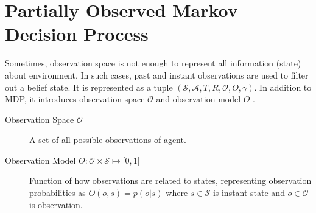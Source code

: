 \section{Partially Observed Markov Decision Process}
\label{sec:pomdp}

Sometimes, observation space is not enough to represent all information (state) about environment. 
In such cases, past and instant observations are used to filter out a belief state. 
It is represented as a tuple $(\mathcal{S},\mathcal{A},T,R,\mathcal{O},O,\gamma)$. 
In addition to MDP, it introduces observation space $\mathcal{O}$ and observation model $O$ \cite{francois-lavet_introduction_2018}. 

\begin{description}
	\item[Observation Space $\mathcal{O}$] A set of all possible observations of agent.
	\item[Observation Model $O \colon \mathcal{O} \times \mathcal{S} \mapsto \lbrack 0,1 \rbrack$] Function of how observations are related to states, 
	representing observation probabilities as $O(o,s) = p(o|s)$ 
	where $s \in \mathcal{S}$ is instant state and $o \in \mathcal{O}$ is observation.
\end{description}

